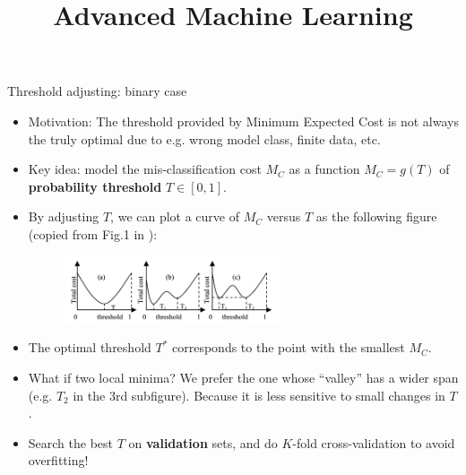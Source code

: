 \documentclass[11pt,compress,t,notes=noshow, xcolor=table]{beamer}
\title{Advanced Machine Learning}
\date{}
\begin{document}



\sloppy



\begin{vbframe}{Threshold adjusting: binary case}
    \footnotesize 
    \begin{itemize}
        \footnotesize
        \item Motivation: The threshold provided by Minimum Expected Cost is not always the truly optimal due to e.g. wrong model class, finite data, etc.
        \item Key idea: model the mis-classification cost $M_C$ as a function $M_C = g(T)$ of \textbf{probability threshold} $T \in [0, 1]$.
        \item By adjusting $T$, we can plot a curve of $M_C$ versus $T$ as the following figure (copied from Fig.1 in \href{https://www.aaai.org/Library/AAAI/2006/aaai06-076.php}{}):
        \begin{figure}[h]
            \centering
            \includegraphics[width=0.6\textwidth]{slides/imbalanced-learning/figure/threshold_adjusting.png}
        \end{figure}

        \item The optimal threshold $T^{*}$ corresponds to the point with the smallest $M_C$.

        \item What if two local minima? We prefer the one whose ``valley'' has a wider span (e.g. $T_2$ in the 3rd subfigure). Because it is less sensitive to small changes in $T$.

        \item Search the best $T$ on \textbf{validation} sets, and do $K$-fold cross-validation to avoid overfitting!
    \end{itemize}
\end{vbframe}
\end{document}
